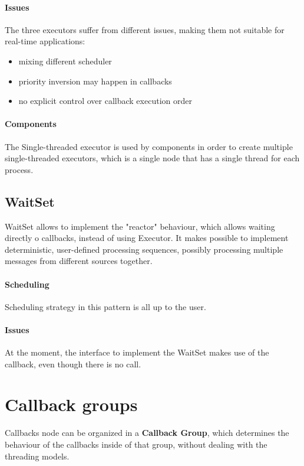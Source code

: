     \paragraph*{Issues} The three executors suffer from different issues, making them not suitable for real-time applications:
    \begin{itemize}
      \item mixing different scheduler
      \item priority inversion may happen in callbacks
      \item no explicit control over callback execution order
    \end{itemize}


    \paragraph*{Components} The Single-threaded executor is used by components in order to create multiple single-threaded executors, which is a single node that has a  single thread for each process.




  \subsection*{WaitSet}
    WaitSet allows to implement the "reactor" behaviour, which allows waiting directly o callbacks, instead of using Executor.
    It makes possible to implement deterministic, user-defined processing sequences, possibly processing multiple messages from different sources together.

    \paragraph*{Scheduling} Scheduling strategy in this pattern is all up to the user.

    \paragraph*{Issues} At the moment, the interface to implement the WaitSet makes use of the callback, even though there is no call.





\section*{Callback groups}
  Callbacks node can be organized in a \textbf{Callback Group}, which determines the behaviour of the callbacks 
  inside of that group, without dealing with the threading 
  models.

